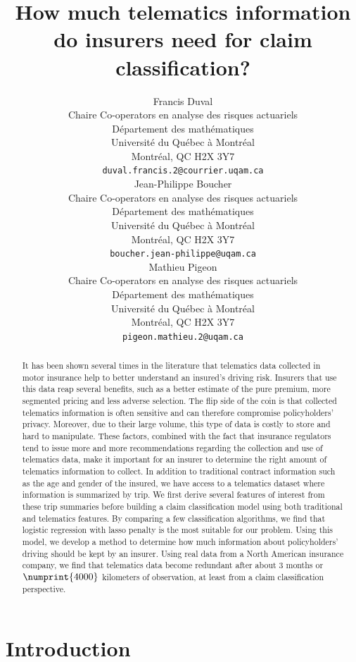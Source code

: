 \documentclass{article}
\title{How much telematics information do insurers need for claim classification?}
\author{
    Francis Duval \\
    Chaire Co-operators en analyse des risques actuariels\\
    Département des mathématiques\\
    Université du Québec à Montréal\\
    Montréal, QC H2X 3Y7\\
    \texttt{duval.francis.2@courrier.uqam.ca} \\
    \And
    Jean-Philippe Boucher\\
    Chaire Co-operators en analyse des risques actuariels\\
    Département des mathématiques\\
    Université du Québec à Montréal\\
    Montréal, QC H2X 3Y7\\
    \texttt{boucher.jean-philippe@uqam.ca} \\
    \And
    Mathieu Pigeon\\
    Chaire Co-operators en analyse des risques actuariels\\
    Département des mathématiques\\
    Université du Québec à Montréal\\
    Montréal, QC H2X 3Y7\\
    \texttt{pigeon.mathieu.2@uqam.ca} \\
}
\begin{document}
\maketitle

\begin{abstract}
    It has been shown several times in the literature that telematics data collected in motor insurance help to better understand an insured's driving risk. Insurers that use this data reap several benefits, such as a better estimate of the pure premium, more segmented pricing and less adverse selection. The flip side of the coin is that collected telematics information is often sensitive and can therefore compromise policyholders' privacy. Moreover, due to their large volume, this type of data is costly to store and hard to manipulate. These factors, combined with the fact that insurance regulators tend to issue more and more recommendations regarding the collection and use of telematics data, make it important for an insurer to determine the right amount of telematics information to collect. In addition to traditional contract information such as the age and gender of the insured, we have access to a telematics dataset where information is summarized by trip. We first derive several features of interest from these trip summaries before building a claim classification model using both traditional and telematics features. By comparing a few classification algorithms, we find that logistic regression with lasso penalty is the most suitable for our problem. Using this model, we develop a method to determine how much information about policyholders' driving should be kept by an insurer. Using real data from a North American insurance company, we find that telematics data become redundant after about $3$ months or $\numprint{4000}$ kilometers of observation, at least from a claim classification perspective.
\end{abstract}


\section{Introduction}\label{sec:intro}
\end{document}
